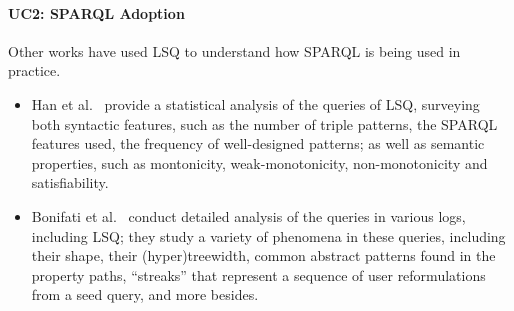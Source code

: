 







\paragraph{UC2: SPARQL Adoption}
\label{sec-sparql_adoption_uc}

Other works have used LSQ to understand how SPARQL is being used in practice. 


\begin{itemize}
\item Han et al.~\cite{han2016statistical} provide a statistical analysis of the queries of LSQ, surveying both syntactic features, such as the number of triple patterns, the SPARQL features used, the frequency of well-designed patterns; as well as semantic properties, such as montonicity, weak-monotonicity, non-monotonicity and satisfiability.
\item Bonifati et al.~\cite{BonifatiMT17,bonifati2018darql} conduct detailed analysis of the queries in various logs, including LSQ; they study a variety of phenomena in these queries, including their shape, their (hyper)treewidth, common abstract patterns found in the property paths, ``streaks'' that represent a sequence of user reformulations from a seed query, and more besides.
\end{itemize}   

